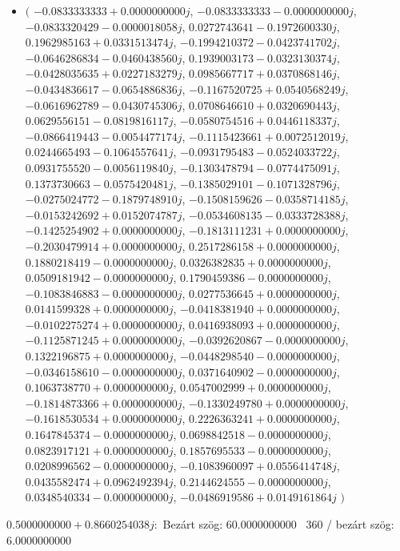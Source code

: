 \documentclass[14pt,a4paper]{article}
\begin{document}
\begin{itemize}
\item
$\big($
$-0.0833333333+0.0000000000j$, $-0.0833333333-0.0000000000j$, $-0.0833320429-0.0000018058j$, $0.0272743641-0.1972600330j$, $0.1962985163+0.0331513474j$, $-0.1994210372-0.0423741702j$, $-0.0646286834-0.0460438560j$, $0.1939003173-0.0323130374j$, $-0.0428035635+0.0227183279j$, $0.0985667717+0.0370868146j$, $-0.0434836617-0.0654886836j$, $-0.1167520725+0.0540568249j$, $-0.0616962789-0.0430745306j$, $0.0708646610+0.0320690443j$, $0.0629556151-0.0819816117j$, $-0.0580754516+0.0446118337j$, $-0.0866419443-0.0054477174j$, $-0.1115423661+0.0072512019j$, $0.0244665493-0.1064557641j$, $-0.0931795483-0.0524033722j$, $0.0931755520-0.0056119840j$, $-0.1303478794-0.0774475091j$, $0.1373730663-0.0575420481j$, $-0.1385029101-0.1071328796j$, $-0.0275024772-0.1879748910j$, $-0.1508159626-0.0358714185j$, $-0.0153242692+0.0152074787j$, $-0.0534608135-0.0333728388j$, $-0.1425254902+0.0000000000j$, $-0.1813111231+0.0000000000j$, $-0.2030479914+0.0000000000j$, $0.2517286158+0.0000000000j$, $0.1880218419-0.0000000000j$, $0.0326382835+0.0000000000j$, $0.0509181942-0.0000000000j$, $0.1790459386-0.0000000000j$, $-0.1083846883-0.0000000000j$, $0.0277536645+0.0000000000j$, $0.0141599328+0.0000000000j$, $-0.0418381940+0.0000000000j$, $-0.0102275274+0.0000000000j$, $0.0416938093+0.0000000000j$, $-0.1125871245+0.0000000000j$, $-0.0392620867-0.0000000000j$, $0.1322196875+0.0000000000j$, $-0.0448298540-0.0000000000j$, $-0.0346158610-0.0000000000j$, $0.0371640902-0.0000000000j$, $0.1063738770+0.0000000000j$, $0.0547002999+0.0000000000j$, $-0.1814873366+0.0000000000j$, $-0.1330249780+0.0000000000j$, $-0.1618530534+0.0000000000j$, $0.2226363241+0.0000000000j$, $0.1647845374-0.0000000000j$, $0.0698842518-0.0000000000j$, $0.0823917121+0.0000000000j$, $0.1857695533-0.0000000000j$, $0.0208996562-0.0000000000j$, $-0.1083960097+0.0556414748j$, $0.0435582474+0.0962492394j$, $0.2144624555-0.0000000000j$, $0.0348540334-0.0000000000j$, $-0.0486919586+0.0149161864j$
$\big)$
\end{itemize}
$0.5000000000+0.8660254038j$:\
Bezárt szög: $60.0000000000$ \
360 / bezárt szög: $6.0000000000$\
\end{document}
